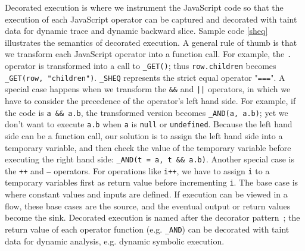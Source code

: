 Decorated execution is where we instrument the JavaScript code so that the execution of each JavaScript operator can be captured and decorated with taint data for dynamic trace and dynamic backward slice.  Sample code \ref{sheq} illustrates the semantics of decorated execution.  
A general rule of thumb is that we transform each JavaScript operator into a function call.  For example, the {\tt .} operator is transformed into a call to {\tt \_GET()}; thus {\tt row.children} becomes {\tt \_GET(row, "children")}.  {\tt \_SHEQ} represents the strict equal operator "{\tt ===}".  
A special case happens when we transform the {\tt \&\&} and {\tt |}{\tt |} operators, in which we have to consider the precedence of the operator's left hand side.   
For example, if the code is {\tt a \&\& a.b}, the transformed version becomes {\tt \_AND(a, a.b)}; yet we don't want to execute {\tt a.b} when {\tt a} is {\tt null} or {\tt undefined}.  
Because the left hand side can be a function call, our solution is to assign the left hand side into a temporary variable, and then check the value of the temporary variable before executing the right hand side: {\tt \_AND(t = a, t \&\& a.b)}.  
Another special case is the {\tt ++} and {\tt --} operators.  For operations like {\tt i++}, we have to assign {\tt i} to a temporary variables first as return value before incrementing {\tt i}.
The base case is where constant values and inputs are defined.  If execution can be viewed in a flow, these base cases are the source, and the eventual output or return values become the sink.
Decorated execution is named after the decorator pattern~\cite{decoratorPattern}; the return value of each operator function (e.g. {\tt \_AND}) can be decorated with taint data for dynamic analysis, e.g. dynamic symbolic execution.  




